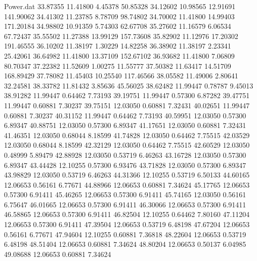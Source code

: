 \begin{filecontents}{Power.dat}
  33.87355   11.41800    4.45378   50.85328
  34.12602   10.98565   12.91691  141.90062
  34.41302   11.23785    8.78709   98.74802
  34.70002   11.41800   14.99403  171.20184
  34.98802   10.91359    5.74303   62.67708
  35.27602   11.16579    6.06534   67.72437
  35.55502   11.27388   13.99129  157.73608
  35.82902   11.12976   17.20302  191.46555
  36.10202   11.38197    1.30229   14.82258
  36.38902   11.38197    2.23341   25.42061
  36.64982   11.41800   13.37109  152.67102
  36.93682   11.41800    7.06809   80.70347
  37.22382   11.52609    1.00275   11.55777
  37.50382   11.63417   14.51709  168.89429
  37.78082   11.45403   10.25540  117.46566
  38.05582   11.49006    2.80641   32.24581
  38.33782   11.81432    3.85636   45.56025
  38.62482   11.99447    0.78787    9.45013
  38.91282   11.99447    0.64462    7.73193
  39.19751   11.99447    0.57300    6.87282
  39.47751   11.99447    0.60881    7.30237
  39.75151   12.03050    0.60881    7.32431
  40.02651   11.99447    0.60881    7.30237
  40.31152   11.99447    0.64462    7.73193
  40.59951   12.03050    0.57300    6.89347
  40.88751   12.03050    0.57300    6.89347
  41.17651   12.03050    0.60881    7.32431
  41.46351   12.03050    0.68044    8.18599
  41.74828   12.03050    0.64462    7.75515
  42.03529   12.03050    0.68044    8.18599
  42.32129   12.03050    0.64462    7.75515
  42.60529   12.03050    0.48999    5.89479
  42.88928   12.03050    0.53719    6.46263
  43.16728   12.03050    0.57300    6.89347
  43.44428   12.10255    0.57300    6.93476
  43.71828   12.03050    0.57300    6.89347
  43.98829   12.03050    0.53719    6.46263
  44.31366   12.10255    0.53719    6.50133
  44.60165   12.06653    0.56161    6.77671
  44.88966   12.06653    0.60881    7.34624
  45.17765   12.06653    0.57300    6.91411
  45.46265   12.06653    0.57300    6.91411
  45.74165   12.03050    0.56161    6.75647
  46.01665   12.06653    0.57300    6.91411
  46.30066   12.06653    0.57300    6.91411
  46.58865   12.06653    0.57300    6.91411
  46.82504   12.10255    0.64462    7.80160
  47.11204   12.06653    0.57300    6.91411
  47.39504   12.06653    0.53719    6.48198
  47.67204   12.06653    0.56161    6.77671
  47.94604   12.10255    0.60881    7.36818
  48.22604   12.06653    0.53719    6.48198
  48.51404   12.06653    0.60881    7.34624
  48.80204   12.06653    0.50137    6.04985
  49.08688   12.06653    0.60881    7.34624
\end{filecontents}
